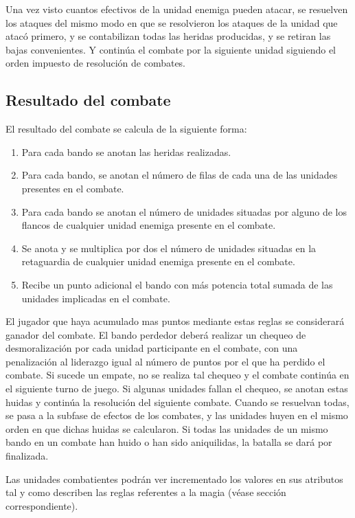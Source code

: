 Una vez visto cuantos efectivos de la unidad enemiga pueden atacar, se
resuelven los ataques del mismo modo en que se resolvieron los ataques
de la unidad que atacó primero, y se contabilizan todas las heridas
producidas, y se retiran las bajas convenientes. Y continúa el combate
por la siguiente unidad siguiendo el orden impuesto de resolución de combates.

\subsection*{Resultado del combate}
\label{resultadocombate}
El resultado del combate se calcula de la siguiente forma:
\begin{enumerate}
\item Para cada bando se anotan las heridas realizadas.
\item Para cada bando, se anotan el número de filas de cada una de las
  unidades presentes en el combate.
\item Para cada bando se anotan el número de unidades situadas por alguno de los flancos de cualquier unidad enemiga presente en el combate.
\item Se anota y se multiplica por dos el número de unidades situadas en la retaguardia de cualquier unidad enemiga presente en el combate.
\item Recibe un punto adicional el bando con más potencia total sumada de las unidades implicadas en el combate.
\end{enumerate}

El jugador que haya acumulado mas puntos mediante estas reglas se
considerará ganador del combate. El bando perdedor deberá realizar un
chequeo de desmoralización por cada unidad participante en el combate,
con una penalización al liderazgo igual al número de puntos por el que
ha perdido el combate. Si sucede un empate, no se realiza tal chequeo
y el combate continúa en el siguiente turno de juego. Si algunas
unidades fallan el chequeo, se anotan estas huidas y continúa la
resolución del siguiente combate. Cuando se resuelvan todas, se pasa a
la subfase de efectos de los combates, y las unidades huyen en el
mismo orden en que dichas huidas se calcularon. Si todas las unidades de un
mismo bando en un combate han huido o han sido aniquilidas, la batalla se
dará por finalizada.

Las unidades combatientes podrán ver incrementado los valores en sus
atributos tal y como describen las reglas referentes a la magia (véase
sección correspondiente).

